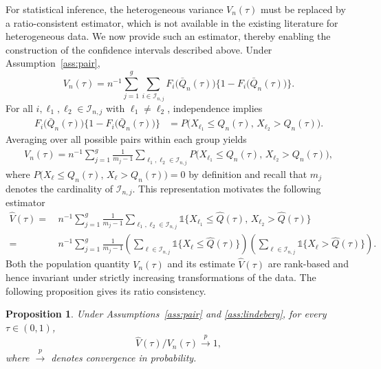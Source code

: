 \documentclass[12pt]{article}
\newtheorem{proposition}{Proposition}
\theoremstyle{remark}
\newcommand{\p}{P}
\begin{document}
For statistical inference, the heterogeneous variance $V_n(\tau)$ must be replaced by a ratio-consistent estimator, which is not available in the existing literature for heterogeneous data. We now provide such an estimator, thereby enabling the construction of the confidence intervals described above. Under Assumption~\ref{ass:pair},
\begin{equation*}
	V_n(\tau)=n^{-1}\sum_{j=1}^{g}\sum_{i\in\mathcal{I}_{n,j}}
	F_i\bigl(\bar Q_n(\tau)\bigr)\bigl\{1-F_i\bigl(\bar Q_n(\tau)\bigr)\bigr\}.
\end{equation*}
For all $i,\ell_1,\ell_2\in\mathcal{I}_{n,j}$ with $\ell_1\ne\ell_2$, independence implies
\begin{align*}
	F_i\bigl(\bar Q_n(\tau)\bigr)\bigl\{1-F_i\bigl(\bar Q_n(\tau)\bigr)\bigr\}
	&= \p\bigl(X_{\ell_1}\le Q_n(\tau),\,X_{\ell_2}>Q_n(\tau)\bigr).
\end{align*}
Averaging over all possible pairs within each group yields
\begin{align*}
	V_n(\tau)
	= n^{-1}\sum_{j=1}^{g}\frac{1}{m_j-1}
	\sum_{\ell_1,\ell_2\in\mathcal{I}_{n,j}}
	\p\bigl(X_{\ell_1}\le Q_n(\tau),\,X_{\ell_2}>Q_n(\tau)\bigr),
\end{align*}
where $\p\bigl(X_{\ell}\le Q_n(\tau),\,X_{\ell}>Q_n(\tau)\bigr)=0$ by definition and recall that $m_j$ denotes the cardinality of $\mathcal{I}_{n,j}$. This representation motivates the following estimator
\begin{align*}
	\widehat V(\tau)
	=&\,n^{-1}\sum_{j=1}^{g}\frac{1}{m_j-1}
	\sum_{\ell_1,\ell_2\in\mathcal{I}_{n,j}}
	\mathds{1}\bigl\{X_{\ell_1}\le \widehat Q(\tau),\,X_{\ell_2}>\widehat Q(\tau)\bigr\}\\
	=&\,n^{-1}\sum_{j=1}^{g}\frac{1}{m_j-1}
	\left(\sum_{\ell\in\mathcal{I}_{n,j}}\mathds{1}\{X_{\ell}\le \widehat Q(\tau)\}\right)
	\left(\sum_{\ell\in\mathcal{I}_{n,j}}\mathds{1}\{X_{\ell}>\widehat Q (\tau)\}\right).
\end{align*}
Both the population quantity $V_n(\tau)$ and its estimate $\widehat V(\tau)$ are rank-based and hence invariant under strictly increasing transformations of the data. The following proposition gives its ratio consistency.

\begin{proposition}\label{lem:consistency}
	Under Assumptions~\ref{ass:pair} and \ref{ass:lindeberg}, for every $\tau\in(0,1)$,
	\begin{equation*}
		\widehat V(\tau)/V_n(\tau)\xrightarrow{p}1,
	\end{equation*}
	where $\xrightarrow{p}$ denotes convergence in probability.
\end{proposition}
\end{document}
